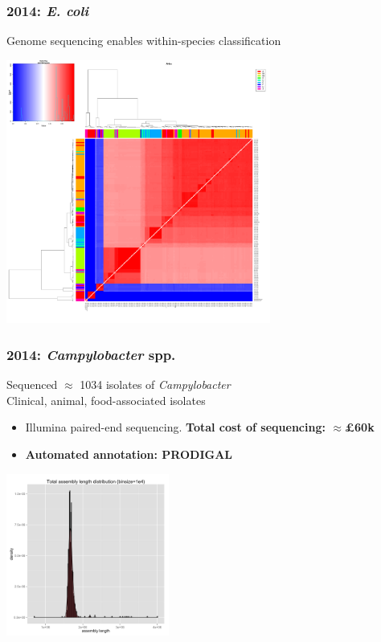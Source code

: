 \begin{frame}
  \frametitle{2014: \textit{E. coli}}
  Genome sequencing enables within-species classification
  \begin{center}
    \includegraphics[width=0.65\textwidth]{images/ANIm_Ecoli}
  \end{center}      
\end{frame}

\begin{frame}
  \frametitle{2014: \textit{Campylobacter} spp.}
  Sequenced $\approx$ 1034 isolates of \textit{Campylobacter} \\
  Clinical, animal, food-associated isolates
  \begin{itemize}
    \item Illumina paired-end sequencing. \textbf{Total cost of sequencing: $\approx$\pounds60k}
    \item \textbf{Automated annotation: PRODIGAL}    
  \end{itemize}      
  \begin{center}
    \includegraphics[width=0.4\textwidth]{images/Asm_long_contigs_length_histogram}
  \end{center}        
\end{frame}

